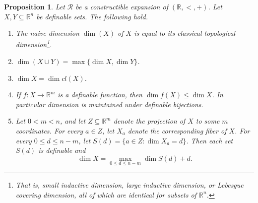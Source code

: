 \documentclass[12pt]{article}
\newcommand{\Rr}{\mathcal{R}}
\newcommand{\R}{\mathbb{R}}
\newtheorem{proposition}[theorem]{Proposition}
\theoremstyle{definition}
\theoremstyle{remark}
\begin{document}
\begin{proposition}\label{prop:dim}
Let $\Rr$ be a constructible expansion of $(\R,<,+)$. Let $X, Y\subseteq \R^n$ be definable sets. The following hold. 
\begin{enumerate}
    \item \label{itm:dim-Lebesgue} The naive dimension $\dim(X)$ of 
    $X$ is equal to its classical topological dimension\footnote{That is, small inductive dimension, large inductive dimension, or Lebesgue covering dimension, all of which are identical for subsets of $\R^n$.}.
    \item \label{itm:dim-union} $\dim(X\cup Y)=\max\{ \dim X, \dim Y\}$.
    \item \label{itm:dim-cl} $\dim X = \dim cl(X)$.
    \item \label{itm:dim-f} If $f:X\rightarrow \R^m$ is a definable function, then $\dim f(X) \leq \dim X$. In particular dimension is maintained under definable bijections.
    \item \label{itm:dim-fiber} Let $0<m<n$, and let $Z\subseteq \R^m$ denote the projection of $X$ to some $m$ coordinates. For every $a\in Z$, let $X_a$ denote the corresponding fiber of $X$. For every $0\leq d \leq n-m$, let $S(d)=\{ a\in Z : \dim X_a =d\}$. Then each set $S(d)$ is definable and 
    \[
    \dim X = \max_{0\leq d \leq n-m} \dim S(d) + d.  
    \]
\end{enumerate}
\end{proposition}
\end{document}
